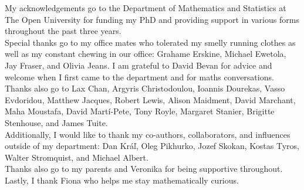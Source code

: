 \documentclass[12pt, a4paper, twoside]{report}
\begin{document}
My acknowledgements go to the Department of Mathematics and Statistics at The Open University for funding my PhD and providing support in various forms throughout the past three years.\\

Special thanks go to my office mates who tolerated my smelly running clothes as well as my constant chewing in our office: Grahame Erskine, Michael Ewetola, Jay Fraser, and Olivia Jeans. I am grateful to David Bevan for advice and welcome when I first came to the department and for maths conversations. Thanks also go to Lax Chan, Argyris Christodoulou, Ioannis Dourekas, Vasso Evdoridou, Matthew Jacques, Robert Lewis, Alison Maidment, David Marchant, Maha Moustafa, David Mart\'{i}-Pete, Tony Royle, Margaret Stanier, Brigitte Stenhouse, and James Tuite.\\

Additionally, I would like to thank my co-authors, collaborators, and influences outside of my department: Dan Kr\'a\v{l}, Oleg Pikhurko, Jozef Skokan, Kostas Tyros, Walter Stromquist, and Michael Albert.\\

Thanks also go to my parents and Veronika for being supportive throughout.\\

Lastly, I thank Fiona who helps me stay mathematically curious.
\end{document}
